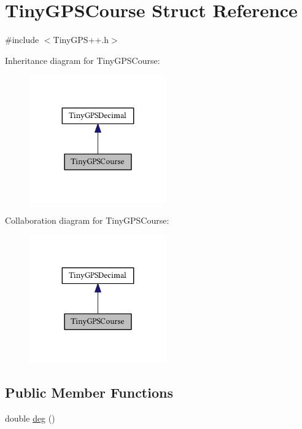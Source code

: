 \hypertarget{struct_tiny_g_p_s_course}{}\section{Tiny\+G\+P\+S\+Course Struct Reference}
\label{struct_tiny_g_p_s_course}


{\ttfamily \#include $<$Tiny\+G\+P\+S++.\+h$>$}



Inheritance diagram for Tiny\+G\+P\+S\+Course\+:\nopagebreak
\begin{figure}[H]
\begin{center}
\leavevmode
\includegraphics[width=167pt]{struct_tiny_g_p_s_course__inherit__graph}
\end{center}
\end{figure}


Collaboration diagram for Tiny\+G\+P\+S\+Course\+:\nopagebreak
\begin{figure}[H]
\begin{center}
\leavevmode
\includegraphics[width=167pt]{struct_tiny_g_p_s_course__coll__graph}
\end{center}
\end{figure}
\subsection*{Public Member Functions}
\begin{DoxyCompactItemize}
\item 
double \hyperlink{struct_tiny_g_p_s_course_a76dc8ae6c2fe5ead9b44c8d53a3272ca}{deg} ()
\end{DoxyCompactItemize}


